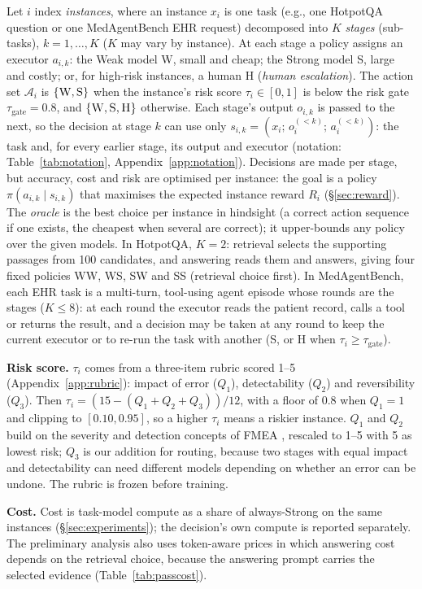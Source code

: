 \documentclass{article}
\newcommand{\W}{\textsc{W}}
\newcommand{\Sg}{\textsc{S}}
\newcommand{\Hm}{\textsc{H}}
\begin{document}
Let $i$ index \emph{instances}, where an instance $x_i$ is one task (e.g., one HotpotQA question or one MedAgentBench EHR request) decomposed into $K$ \emph{stages} (sub-tasks), $k=1,\dots,K$ ($K$ may vary by instance). At each stage a policy assigns an executor $a_{i,k}$: the Weak model \W{}, small and cheap; the Strong model \Sg{}, large and costly; or, for high-risk instances, a human \Hm{} (\emph{human escalation}). The action set $\mathcal{A}_i$ is $\{\W,\Sg\}$ when the instance's risk score $\tau_i\in[0,1]$ is below the risk gate $\tau_{\text{gate}}=0.8$, and $\{\W,\Sg,\Hm\}$ otherwise. Each stage's output $o_{i,k}$ is passed to the next, so the decision at stage $k$ can use only $s_{i,k}=(x_i;\, o_i^{(<k)};\, a_i^{(<k)})$: the task and, for every earlier stage, its output and executor (notation: Table~\ref{tab:notation}, Appendix~\ref{app:notation}). Decisions are made per stage, but accuracy, cost and risk are optimised per instance: the goal is a policy $\pi(a_{i,k}\mid s_{i,k})$ that maximises the expected instance reward $R_i$ (\S\ref{sec:reward}). The \emph{oracle} is the best choice per instance in hindsight (a correct action sequence if one exists, the cheapest when several are correct); it upper-bounds any policy over the given models. In HotpotQA, $K{=}2$: retrieval selects the supporting passages from 100 candidates, and answering reads them and answers, giving four fixed policies \W\W, \W\Sg, \Sg\W{} and \Sg\Sg{} (retrieval choice first). In MedAgentBench, each EHR task is a multi-turn, tool-using agent episode whose rounds are the stages ($K\le8$): at each round the executor reads the patient record, calls a tool or returns the result, and a decision may be taken at any round to keep the current executor or to re-run the task with another (\Sg, or \Hm{} when $\tau_i\ge\tau_{\text{gate}}$).

\textbf{Risk score.} $\tau_i$ comes from a three-item rubric scored 1--5 (Appendix~\ref{app:rubric}): impact of error ($Q_1$), detectability ($Q_2$) and reversibility ($Q_3$). Then $\tau_i = (15 - (Q_1+Q_2+Q_3))/12$, with a floor of 0.8 when $Q_1{=}1$ and clipping to $[0.10, 0.95]$, so a higher $\tau_i$ means a riskier instance. $Q_1$ and $Q_2$ build on the severity and detection concepts of FMEA \citep{iec60812}, rescaled to 1--5 with 5 as lowest risk; $Q_3$ is our addition for routing, because two stages with equal impact and detectability can need different models depending on whether an error can be undone. The rubric is frozen before training.

\textbf{Cost.} Cost is task-model compute as a share of always-Strong on the same instances (\S\ref{sec:experiments}); the decision's own compute is reported separately. The preliminary analysis also uses token-aware prices in which answering cost depends on the retrieval choice, because the answering prompt carries the selected evidence (Table~\ref{tab:passcost}).
\end{document}
